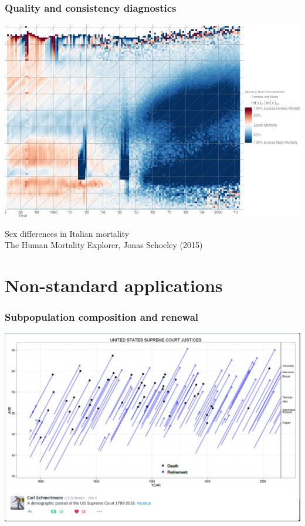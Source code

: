 \documentclass[20pt]{beamer}
\begin{document}


\begin{frame}
\frametitle{Quality and consistency diagnostics}
\begin{center}
\includegraphics[scale=.8]{Figures/Schoeley2.png}
\end{center}
Sex differences in Italian mortality\\The Human Mortality Explorer, Jonas
Schoeley (2015)
\end{frame}


\section{Non-standard applications}

\begin{frame}
\frametitle{Subpopulation composition and renewal}
\includegraphics[scale=.65]{Figures/SchmertmannJustices.png}
\end{frame}
\end{document}
